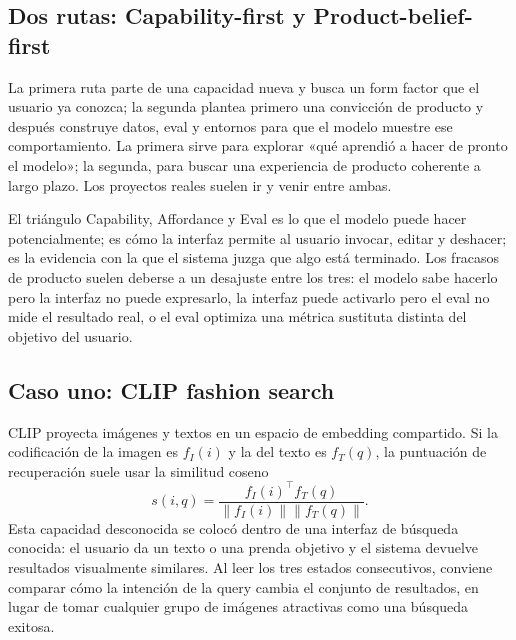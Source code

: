 \subsection{Dos rutas: Capability-first y Product-belief-first}

La primera ruta parte de una capacidad nueva y busca un form factor que el usuario ya conozca; la segunda plantea primero una convicción de producto y después construye datos, eval y entornos para que el modelo muestre ese comportamiento. La primera sirve para explorar «qué aprendió a hacer de pronto el modelo»; la segunda, para buscar una experiencia de producto coherente a largo plazo. Los proyectos reales suelen ir y venir entre ambas.



\begin{importantbox}{El triángulo Capability, Affordance y Eval}
 es lo que el modelo puede hacer potencialmente;  es cómo la interfaz permite al usuario invocar, editar y deshacer;  es la evidencia con la que el sistema juzga que algo está terminado. Los fracasos de producto suelen deberse a un desajuste entre los tres: el modelo sabe hacerlo pero la interfaz no puede expresarlo, la interfaz puede activarlo pero el eval no mide el resultado real, o el eval optimiza una métrica sustituta distinta del objetivo del usuario.
\end{importantbox}

\subsection{Caso uno: CLIP fashion search}

CLIP proyecta imágenes y textos en un espacio de embedding compartido. Si la codificación de la imagen es $f_I(i)$ y la del texto es $f_T(q)$, la puntuación de recuperación suele usar la similitud coseno
\[
s(i,q)=\frac{f_I(i)^{\top}f_T(q)}{\lVert f_I(i)\rVert\lVert f_T(q)\rVert}.
\]
Esta capacidad desconocida se colocó dentro de una interfaz de búsqueda conocida: el usuario da un texto o una prenda objetivo y el sistema devuelve resultados visualmente similares. Al leer los tres estados consecutivos, conviene comparar cómo la intención de la query cambia el conjunto de resultados, en lugar de tomar cualquier grupo de imágenes atractivas como una búsqueda exitosa.

